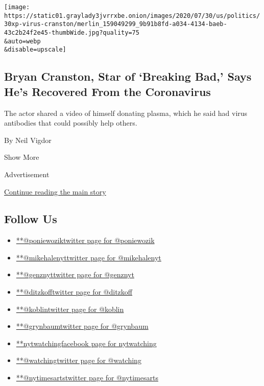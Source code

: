 \begin{enumerate}
  \texttt{[image: https://static01.graylady3jvrrxbe.onion/images/2020/07/30/us/politics/30xp-virus-cranston/merlin\_159049299\_9b91b8fd-a034-4134-baeb-43c2b24f2e45-thumbWide.jpg?quality=75\\\&auto=webp\\\&disable=upscale]}

  \hypertarget{bryan-cranston-star-of-breaking-bad-says-hes-recovered-from-the-coronavirus}{%
  \subsection{Bryan Cranston, Star of `Breaking Bad,' Says He's
  Recovered From the
  Coronavirus}\label{bryan-cranston-star-of-breaking-bad-says-hes-recovered-from-the-coronavirus}}

  The actor shared a video of himself donating plasma, which he said had
  virus antibodies that could possibly help others.

  By Neil Vigdor
\end{enumerate}

Show More

Advertisement

\protect\hyperlink{after-mid2}{Continue reading the main story}

\hypertarget{follow-us}{%
\subsection{Follow Us}\label{follow-us}}

\begin{itemize}
\tightlist
\item
  \href{https://twitter.com/poniewozik}{**@poniewoziktwitter page for
  @poniewozik}
\item
  \href{https://twitter.com/mikehalenyt}{**@mikehalenyttwitter page for
  @mikehalenyt}
\item
  \href{https://twitter.com/genznyt}{**@genznyttwitter page for
  @genznyt}
\item
  \href{https://twitter.com/ditzkoff}{**@ditzkofftwitter page for
  @ditzkoff}
\item
  \href{https://twitter.com/koblin}{**@koblintwitter page for @koblin}
\item
  \href{https://twitter.com/grynbaum}{**@grynbaumtwitter page for
  @grynbaum}
\item
  \href{https://www.facebookcorewwwi.onion/nytwatching}{**nytwatchingfacebook
  page for nytwatching}
\item
  \href{https://twitter.com/watching}{**@watchingtwitter page for
  @watching}
\item
  \href{https://twitter.com/nytimesarts}{**@nytimesartstwitter page for
  @nytimesarts}
\end{itemize}

